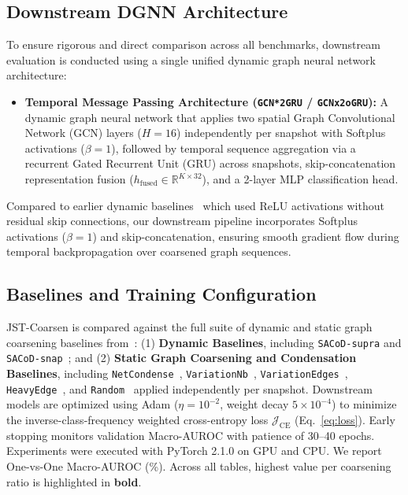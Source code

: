 \documentclass[sigconf]{acmart}
\begin{document}
\subsection{Downstream DGNN Architecture}
\label{sec:architectures}
To ensure rigorous and direct comparison across all benchmarks, downstream evaluation is conducted using a single unified dynamic graph neural network architecture:
\begin{itemize}
    \item \textbf{Temporal Message Passing Architecture (\texttt{GCN*2GRU} / \texttt{GCNx2oGRU}):} A dynamic graph neural network that applies two spatial Graph Convolutional Network (GCN) layers ($H = 16$) independently per snapshot with Softplus activations ($\beta = 1$), followed by temporal sequence aggregation via a recurrent Gated Recurrent Unit (GRU) across snapshots, skip-concatenation representation fusion ($h_{\text{fused}} \in \mathbb{R}^{K \times 32}$), and a 2-layer MLP classification head.
\end{itemize}
Compared to earlier dynamic baselines~\cite{sacod2026} which used ReLU activations without residual skip connections, our downstream pipeline incorporates Softplus activations ($\beta=1$) and skip-concatenation, ensuring smooth gradient flow during temporal backpropagation over coarsened graph sequences.

\subsection{Baselines and Training Configuration}
\label{sec:config}
JST-Coarsen is compared against the full suite of dynamic and static graph coarsening baselines from~\cite{sacod2026}:
(1) \textbf{Dynamic Baselines}, including \texttt{SACoD-supra} and \texttt{SACoD-snap}~\cite{sacod2026}; and
(2) \textbf{Static Graph Coarsening and Condensation Baselines}, including \texttt{NetCondense}~\cite{liu2022graph}, \texttt{VariationNb}~\cite{loukas2019graph}, \texttt{VariationEdges}~\cite{loukas2019graph}, \texttt{HeavyEdge}~\cite{dhillon2007weighted}, and \texttt{Random}~\cite{loukas2019graph} applied independently per snapshot.
Downstream models are optimized using Adam ($\eta = 10^{-2}$, weight decay $5 \times 10^{-4}$) to minimize the inverse-class-frequency weighted cross-entropy loss $\mathcal{J}_{\text{CE}}$ (Eq.~\eqref{eq:loss}). Early stopping monitors validation Macro-AUROC with patience of 30--40 epochs. Experiments were executed with PyTorch 2.1.0 on GPU and CPU. We report One-vs-One Macro-AUROC (\%). Across all tables, highest value per coarsening ratio is highlighted in \textbf{bold}.
\end{document}
